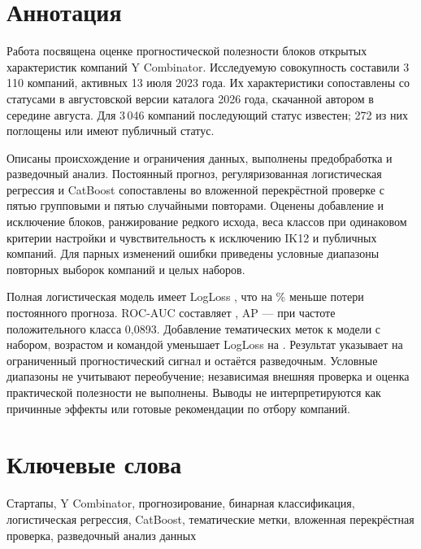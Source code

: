 \section*{Аннотация}

Работа посвящена оценке прогностической полезности блоков открытых характеристик компаний Y Combinator. Исследуемую совокупность составили 3\,110 компаний, активных 13 июля 2023 года. Их характеристики сопоставлены со статусами в августовской версии каталога 2026 года, скачанной автором в середине августа. Для 3\,046 компаний последующий статус известен; 272 из них поглощены или имеют публичный статус.

Описаны происхождение и ограничения данных, выполнены предобработка и разведочный анализ. Постоянный прогноз, регуляризованная логистическая регрессия и CatBoost сопоставлены во вложенной перекрёстной проверке с пятью групповыми и пятью случайными повторами. Оценены добавление и исключение блоков, ранжирование редкого исхода, веса классов при одинаковом критерии настройки и чувствительность к исключению IK12 и публичных компаний. Для парных изменений ошибки приведены условные диапазоны повторных выборок компаний и целых наборов.

Полная логистическая модель имеет LogLoss \resFullLoss{}, что на \resRelativeGain{}\% меньше потери постоянного прогноза. ROC-AUC составляет \resFullAUC{}, AP --- \resFullAP{} при частоте положительного класса 0,0893. Добавление тематических меток к модели с набором, возрастом и командой уменьшает LogLoss на \resTagGain{}. Результат указывает на ограниченный прогностический сигнал и остаётся разведочным. Условные диапазоны не учитывают переобучение; независимая внешняя проверка и оценка практической полезности не выполнены. Выводы не интерпретируются как причинные эффекты или готовые рекомендации по отбору компаний.

\section*{Ключевые слова}
Стартапы, Y Combinator, прогнозирование, бинарная классификация, логистическая регрессия, CatBoost, тематические метки, вложенная перекрёстная проверка, разведочный анализ данных
\pagebreak

